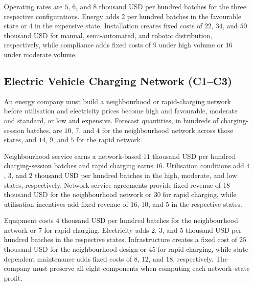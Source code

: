 	Operating rates are \(5\), \(6\), and \(8\) thousand USD per hundred batches for the three respective configurations. Energy adds \(2\) per hundred batches in the favourable state or \(4\) in the expensive state. Installation creates fixed costs of \(22\), \(34\), and \(50\) thousand USD for manual, semi-automated, and robotic distribution, respectively, while compliance adds fixed costs of \(9\) under high volume or \(16\) under moderate volume.

	\subsection{Electric Vehicle Charging Network (C1--C3)}
	\label{sec:problem21-electric-vehicle-charging-network-c1-c3}

	An energy company must build a neighbourhood or rapid-charging network before utilisation and electricity prices become high and favourable, moderate and standard, or low and expensive. Forecast quantities, in hundreds of charging-session batches, are \(10\), \(7\), and \(4\) for the neighbourhood network across those states, and \(14\), \(9\), and \(5\) for the rapid network.

	Neighbourhood service earns a network-based \(11\) thousand USD per hundred charging-session batches and rapid charging earns \(16\). Utilisation conditions add \(4\), \(3\), and \(2\) thousand USD per hundred batches in the high, moderate, and low states, respectively. Network service agreements provide fixed revenue of \(18\) thousand USD for the neighbourhood network or \(30\) for rapid charging, while utilisation incentives add fixed revenue of \(16\), \(10\), and \(5\) in the respective states.

	Equipment costs \(4\) thousand USD per hundred batches for the neighbourhood network or \(7\) for rapid charging. Electricity adds \(2\), \(3\), and \(5\) thousand USD per hundred batches in the respective states. Infrastructure creates a fixed cost of \(25\) thousand USD for the neighbourhood design or \(45\) for rapid charging, while state-dependent maintenance adds fixed costs of \(8\), \(12\), and \(18\), respectively. The company must preserve all eight components when computing each network--state profit.


